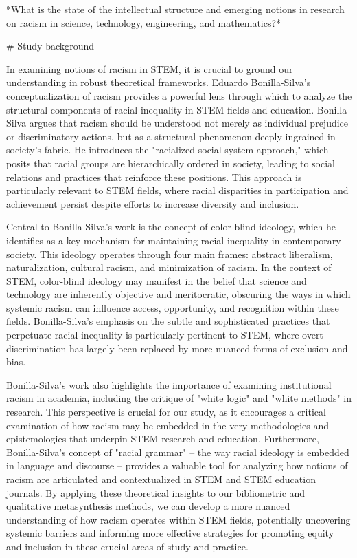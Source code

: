 {{*What is the state of the intellectual structure and emerging notions in research on racism in science, technology, engineering, and mathematics?*


# Study background

In examining notions of racism in STEM, it is crucial to ground our understanding in robust theoretical frameworks. Eduardo Bonilla-Silva's conceptualization of racism provides a powerful lens through which to analyze the structural components of racial inequality in STEM fields and education. Bonilla-Silva argues that racism should be understood not merely as individual prejudice or discriminatory actions, but as a structural phenomenon deeply ingrained in society's fabric. He introduces the "racialized social system approach," which posits that racial groups are hierarchically ordered in society, leading to social relations and practices that reinforce these positions. This approach is particularly relevant to STEM fields, where racial disparities in participation and achievement persist despite efforts to increase diversity and inclusion.

Central to Bonilla-Silva's work is the concept of color-blind ideology, which he identifies as a key mechanism for maintaining racial inequality in contemporary society. This ideology operates through four main frames: abstract liberalism, naturalization, cultural racism, and minimization of racism. In the context of STEM, color-blind ideology may manifest in the belief that science and technology are inherently objective and meritocratic, obscuring the ways in which systemic racism can influence access, opportunity, and recognition within these fields. Bonilla-Silva's emphasis on the subtle and sophisticated practices that perpetuate racial inequality is particularly pertinent to STEM, where overt discrimination has largely been replaced by more nuanced forms of exclusion and bias.

Bonilla-Silva's work also highlights the importance of examining institutional racism in academia, including the critique of "white logic" and "white methods" in research. This perspective is crucial for our study, as it encourages a critical examination of how racism may be embedded in the very methodologies and epistemologies that underpin STEM research and education. Furthermore, Bonilla-Silva's concept of "racial grammar" – the way racial ideology is embedded in language and discourse – provides a valuable tool for analyzing how notions of racism are articulated and contextualized in STEM and STEM education journals. By applying these theoretical insights to our bibliometric and qualitative metasynthesis methods, we can develop a more nuanced understanding of how racism operates within STEM fields, potentially uncovering systemic barriers and informing more effective strategies for promoting equity and inclusion in these crucial areas of study and practice.

}}
